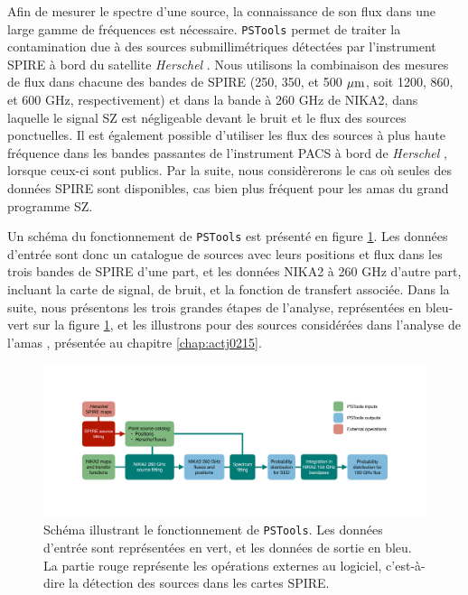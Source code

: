 Afin de mesurer le spectre d'une source, la connaissance de son flux dans une large gamme de fréquences est nécessaire.
\texttt{PSTools} permet de traiter la contamination due à des sources submillimétriques détectées par l'instrument SPIRE à bord du satellite \textit{Herschel} \cite{griffin_herschel-spire_2010}.
Nous utilisons la combinaison des mesures de flux dans chacune des bandes de SPIRE (250, 350, et 500 ${\rm \mu m}$, soit 1200, 860, et 600 GHz, respectivement) et dans la bande à 260 GHz de NIKA2, dans laquelle le signal SZ est négligeable devant le bruit et le flux des sources ponctuelles.
Il est également possible d'utiliser les flux des sources à plus haute fréquence dans les bandes passantes de l'instrument PACS à bord de \textit{Herschel} \cite{poglitsch_photodetector_2010}, lorsque ceux-ci sont publics.
Par la suite, nous considèrerons le cas où seules des données SPIRE sont disponibles, cas bien plus fréquent pour les amas du grand programme SZ.

Un schéma du fonctionnement de \texttt{PSTools} est présenté en figure \ref{fig:pstools_schema}.
Les données d'entrée sont donc un catalogue de sources avec leurs positions et flux dans les trois bandes de SPIRE d'une part, et les données NIKA2 à 260 GHz d'autre part, incluant la carte de signal, de bruit, et la fonction de transfert associée.
Dans la suite, nous présentons les trois grandes étapes de l'analyse, représentées en bleu-vert sur la figure \ref{fig:pstools_schema}, et les illustrons pour des sources considérées dans l'analyse de l'amas \act, présentée au chapitre \ref{chap:actj0215}.

\begin{figure}[t]
    \centering
    \includegraphics[width=\linewidth, trim={8cm, 7cm, 8cm, 7cm}, clip]{Figures/Chap_decor/PSTools.pdf}
    \caption{
        Schéma illustrant le fonctionnement de \texttt{PSTools}.
        Les données d'entrée sont représentées en vert, et les données de sortie en bleu.
        La partie rouge représente les opérations externes au logiciel, c'est-à-dire la détection des sources dans les cartes SPIRE.
    }
    \label{fig:pstools_schema}
\end{figure}

